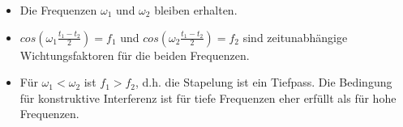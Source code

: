 \begin{itemize}
\item Die Frequenzen $\omega_1$ und $\omega_2$ bleiben erhalten.
\item $cos(\omega_1\frac{t_1-t_2}{2})=f_1$ und $cos(\omega_2\frac{t_1-t_2}{2})=f_2$ sind zeitunabhängige Wichtungsfaktoren für die beiden Frequenzen.
\item Für $\omega_1<\omega_2$ ist $f_1>f_2$, d.h. die Stapelung ist ein Tiefpass. Die Bedingung für konstruktive Interferenz ist für tiefe Frequenzen eher erfüllt als für hohe Frequenzen. 
\end{itemize}